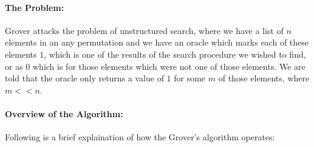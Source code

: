 \paragraph*{The Problem:} Grover attacks the problem of unstructured search, where we have a list of $n$ elements in an any permutation and we have an oracle which marks each of these elements $1$, which is one of the results of the search procedure we wished to find, or as $0$ which is for those elements which were not one of those elements. We are told that the oracle only returns a value of $1$ for some $m$ of those elements, where $m << n$.

\paragraph*{Overview of the Algorithm:} Following is a brief explaination of how the Grover's algorithm operates:

